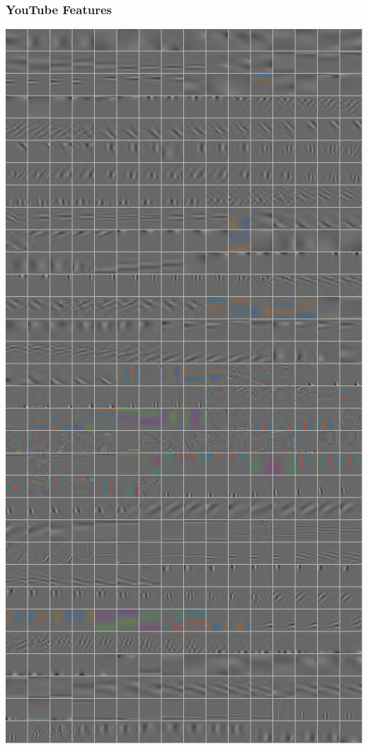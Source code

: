 \documentclass{beamer}
\begin{document}
\begin{frame}
\frametitle{YouTube Features} 
\begin{center} 
\includegraphics[scale=0.2]{./figures/sf_yt.png} \hspace{0.5cm} 

\end{center}
\end{frame}
\end{document}
